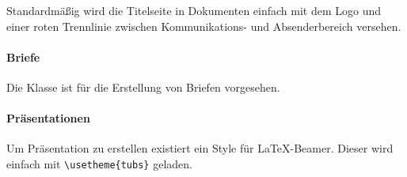 Standardmäßig wird die Titelseite in Dokumenten einfach mit dem Logo und einer
roten Trennlinie zwischen Kommunikations- und Absenderbereich versehen.

\paragraph{Briefe}

Die Klasse  ist für die Erstellung von Briefen
vorgesehen.

\paragraph{Präsentationen}
Um Präsentation zu erstellen existiert ein Style für \LaTeX-Beamer.
Dieser wird einfach mit \lstinline!\usetheme{tubs}! geladen.
